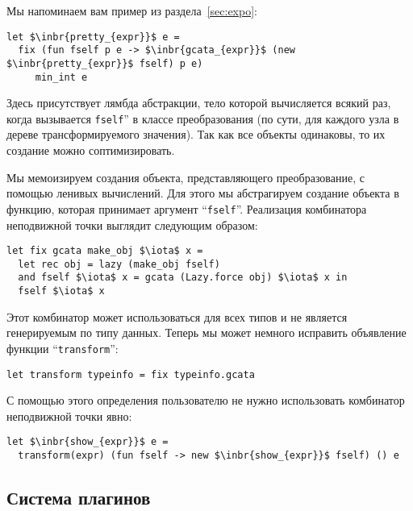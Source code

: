 Мы напоминаем вам пример из раздела~\ref{sec:expo}:

\begin{lstlisting}
let $\inbr{pretty_{expr}}$ e =
  fix (fun fself p e -> $\inbr{gcata_{expr}}$ (new $\inbr{pretty_{expr}}$ fself) p e)
     min_int e
\end{lstlisting}

Здесь присутствует лямбда абстракции, тело которой вычисляется всякий раз, когда вызывается \lstinline{fself}'' в классе преобразования (по сути, для каждого узла в дереве трансформируемого значения). Так как все объекты одинаковы, то их создание можно соптимизировать.

Мы мемоизируем создания объекта, представляющего преобразование, с помощью ленивых вычислений. Для этого мы абстрагируем создание объекта в функцию, которая принимает
аргумент ``\lstinline{fself}''. Реализация комбинатора неподвижной точки выглядит следующим образом:

\begin{lstlisting}
let fix gcata make_obj $\iota$ x =
  let rec obj = lazy (make_obj fself)
  and fself $\iota$ x = gcata (Lazy.force obj) $\iota$ x in
  fself $\iota$ x
\end{lstlisting}

Этот комбинатор может использоваться для всех типов и не является генерируемым по типу данных. Теперь мы может немного исправить объявление функции ``\lstinline{transform}'':

\begin{lstlisting}
let transform typeinfo = fix typeinfo.gcata
\end{lstlisting}

С помощью этого определения пользователю не нужно использовать комбинатор неподвижной точки явно:

\begin{lstlisting}
let $\inbr{show_{expr}}$ e =
  transform(expr) (fun fself -> new $\inbr{show_{expr}}$ fself) () e
\end{lstlisting}

\subsection{Система плагинов}
\label{plugins}

